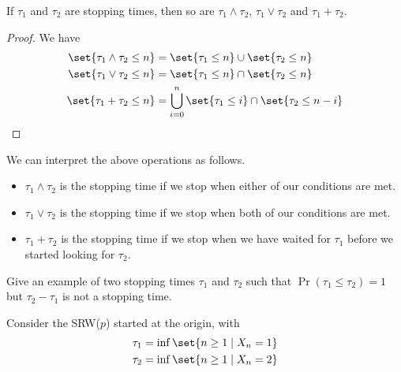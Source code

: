 \begin{proposition}
    If $\tau_1$ and $\tau_2$ are stopping times, then so are
    $\tau_1 \wedge \tau_2$, $\tau_1 \vee \tau_2$ and $\tau_1 + \tau_2$.
\end{proposition}
\begin{proof}
    We have \begin{align*}
        \set{\tau_1 \wedge \tau_2 \le n}
            &= \set{\tau_1 \le n} \cup \set{\tau_2 \le n} \\
        \set{\tau_1 \vee \tau_2 \le n}
            &= \set{\tau_1 \le n} \cap \set{\tau_2 \le n} \\
        \set{\tau_1 + \tau_2 \le n}
            &= \bigcup_{i=0}^{n} \set{\tau_1 \le i} \cap \set{\tau_2 \le n-i}
            \qedhere
    \end{align*}
\end{proof}
We can interpret the above operations as follows.
\begin{itemize}
    \item $\tau_1 \wedge \tau_2$ is the stopping time if we stop when either
    of our conditions are met.
    \item $\tau_1 \vee \tau_2$ is the stopping time if we stop when both of
    our conditions are met.
    \item $\tau_1 + \tau_2$ is the stopping time if we stop when we have
    waited for $\tau_1$ before we started looking for $\tau_2$.
\end{itemize}

\begin{exercise}
    Give an example of two stopping times $\tau_1$ and $\tau_2$ such that
    $\Pr(\tau_1 \le \tau_2) = 1$ but $\tau_2 - \tau_1$ is not a stopping
    time.
\end{exercise}
\begin{solution}
    Consider the SRW($p$) started at the origin, with \begin{align*}
        \tau_1 &= \inf\set{n \ge 1 \mid X_n = 1} \\
        \tau_2 &= \inf\set{n \ge 1 \mid X_n = 2}
    \end{align*}
\end{solution}

